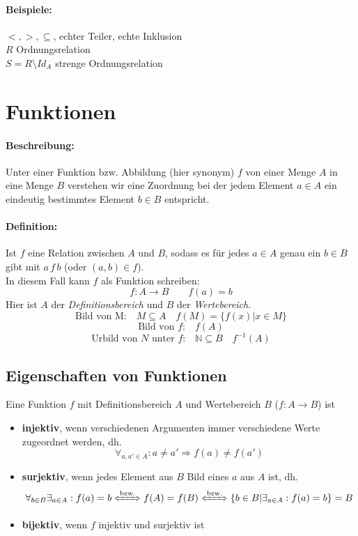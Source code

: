 \paragraph{Beispiele:}$<,>,\subseteq$, \glqq echter Teiler\grqq , \glqq echte Inklusion\grqq
\ \\
$R$ Ordnungsrelation\\
$S=R\setminus Id_A$ strenge Ordnungsrelation

\section{Funktionen}
\paragraph{Beschreibung:}Unter einer Funktion bzw. Abbildung (hier synonym) $f$ von einer Menge $A$ in eine Menge $B$ verstehen wir eine Zuordnung bei der jedem Element $a\in A$ ein eindeutig bestimmtes Element $b\in B$ entspricht.
\paragraph{Definition:}Ist $f$ eine Relation zwischen $A$ und $B$, sodass es für jedes $a\in A$ genau ein $b\in B$ gibt mit $a\, f\, b$ (oder $(a,b)\in f$).\\
In diesem Fall kann $f$ als Funktion schreiben:
\[
f:A\rightarrow B \qquad f(a)=b
\]
Hier ist $A$ der \emph{Definitionsbereich} und $B$ der \emph{Wertebereich}.
\[
\text{Bild von M:} \quad M\subseteq A \quad f(M) = \{f(x) | x\in M\}
\]
\[
\text{Bild von $f$:} \quad f(A)
\]
\[
\text{Urbild von $N$ unter $f$:} \quad \mathbb{N}\subseteq B \quad f^{-1}(A)
\]
\subsection{Eigenschaften von Funktionen}
Eine Funktion $f$ mit Definitionsbereich $A$ und Wertebereich $B$ ($f:A\rightarrow B$) ist
\begin{itemize}
\item \textbf{injektiv}, wenn verschiedenen Argumenten immer verschiedene Werte zugeordnet werden, dh.
\[
\forall_{a,a'\in A}: a\neq a' \Rightarrow f(a)\neq f(a')
\]
\item \textbf{surjektiv}, wenn jedes Element aus $B$ Bild eines $a$ aus $A$ ist, dh.
\[
\forall_{b\in B}\exists_{a\in A}: f(a)=b \xLeftrightarrow{\text{bzw.}} f(A)=f(B) \xLeftrightarrow{\text{bzw.}} \{b\in B | \exists_{a\in A}: f(a)=b\}=B
\]
\item \textbf{bijektiv}, wenn $f$ injektiv und surjektiv ist
\end{itemize}

